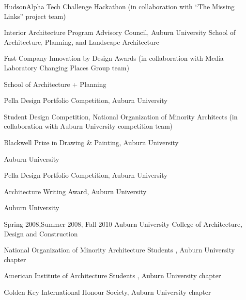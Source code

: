 \documentclass[letterpaper, oneside, 10pt]{article}
\begin{document}
\DotSep{0.25em}
HudsonAlpha Tech Challenge Hackathon (in collaboration with ``The Missing
Links'' project team)

\DotSep{0.25em} Interior Architecture
Program Advisory Council, Auburn University School of Architecture, Planning,
and Landscape Architecture  

\DotSep{0.25em} Fast Company Innovation
by Design Awards (in collaboration with  Media Laboratory Changing
Places Group team)

\DotSep{0.25em}  School of
Architecture + Planning 

\DotSep{0.25em} Pella Design Portfolio
Competition, Auburn University 

\DotSep{0.25em} Student Design Competition,
National Organization of Minority Architects (in collaboration with Auburn
University  competition team)

\DotSep{0.25em} Blackwell Prize in Drawing \&
Painting, Auburn University 

\DotSep{0.25em} Auburn University 

\DotSep{0.25em} Pella Design Portfolio
Competition, Auburn University 

\DotSep{0.25em} Architecture Writing Award, Auburn
University 

\DotSep{0.25em}
Auburn University 

\DotSep{0.25em} Spring 2008,\enspace Summer 2008,\enspace
Fall 2010\DotSep{0.25em} Auburn University College of Architecture, Design and
Construction 

\DotSep{0.25em} National Organization of Minority
Architecture Students , Auburn University chapter

\DotSep{0.25em}
American Institute of Architecture Students , Auburn University
chapter

\DotSep{0.25em} Golden Key International
Honour Society, Auburn University chapter
\end{document}
